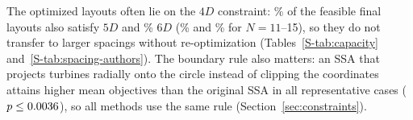 \label{sec:spacing}
\label{sec:boundary}
The optimized layouts often lie on the $4D$ constraint: \NSpFiveAll\% of the feasible final layouts also satisfy $5D$ and \NSpSixAll\% $6D$ (\NSpFiveLarge\% and \NSpSixLarge\% for $N=11$--15), so they do not transfer to larger spacings without re-optimization (Tables~\ref{S-tab:capacity} and~\ref{S-tab:spacing-authors}). The boundary rule also matters: an SSA that projects turbines radially onto the circle instead of clipping the coordinates attains higher mean objectives than the original SSA in all \NBoundCases{} representative cases ($p\le0.0036$), so all methods use the same rule (Section~\ref{sec:constraints}).
